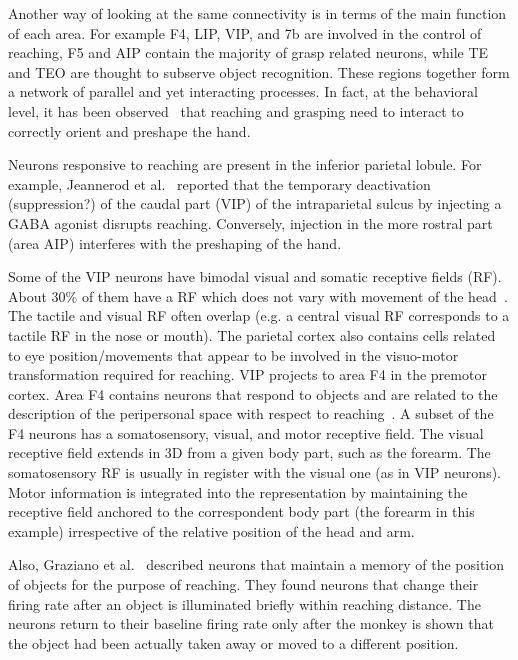 Another way of looking at the same connectivity is in terms of the main 
function of each area. For example F4, LIP, VIP, and 7b are involved in the control of 
reaching, F5 and AIP contain the majority of grasp related neurons, 
while TE and TEO are thought to subserve object recognition. These regions together form a network 
of parallel and yet interacting processes. In fact, at the behavioral level, it has 
been observed~\cite{jeannerod-arbib-rizzolatti-sakata-1995} that reaching and 
grasping need to interact to correctly orient and preshape the hand.

Neurons responsive to reaching are present in the inferior parietal lobule. For 
example, Jeannerod et al.~\cite{jeannerod-arbib-rizzolatti-sakata-1995} reported 
that the temporary deactivation (suppression?) of the caudal part (VIP) of the intraparietal sulcus by injecting a GABA 
agonist
disrupts reaching. Conversely, injection in the more rostral part (area AIP) 
interferes with the
preshaping of the hand. 

Some of the VIP neurons have bimodal visual and somatic receptive 
fields (RF). About 30\% of them have a RF which does not vary with 
movement of the head~\cite{rizzolatti-fogassi-gallese-1997}. The tactile and 
visual RF often overlap (e.g. a central visual 
RF corresponds to a tactile RF in the nose or mouth). The parietal cortex also contains 
cells related to eye position/movements that appear to be involved in  
the visuo-motor transformation required for reaching. VIP projects to area 
F4 in the premotor cortex. Area F4 contains neurons that respond to objects and 
are related to the description of the peripersonal space with respect to reaching~\cite{graziano-hu-gross-1997,fogassi96coding}. A subset of the F4 neurons 
has a somatosensory, visual, and motor receptive field. The visual receptive 
field extends in 3D from a given body part, such as the forearm. The somatosensory RF
is usually in register with the visual one (as in VIP neurons). Motor information
is integrated into the representation by maintaining the receptive
field anchored to the correspondent body part (the forearm in this
example) irrespective of the relative position of the head and arm.

Also, Graziano et al.~\cite{graziano-cooke-taylor-2000} described neurons that maintain a 
memory of the position of objects for the purpose of reaching. They found neurons 
that change their firing rate after an object is illuminated briefly
within reaching distance. The neurons return 
to their baseline firing rate only after the monkey is shown that the object had been 
actually taken away or moved to a different position.

